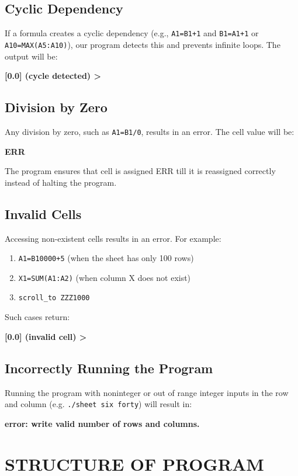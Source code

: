 \documentclass[a4paper]{article}
\begin{document}
\subsection{Cyclic Dependency}
If a formula creates a cyclic dependency (e.g., \texttt{A1=B1+1} and \texttt{B1=A1+1} or \texttt{A10=MAX(A5:A10)}), our program detects this and prevents infinite loops. The output will be:
\begin{center}
    \textbf{[0.0] (cycle detected) >}
\end{center}

\subsection{Division by Zero}
Any division by zero, such as \texttt{A1=B1/0}, results in an error. The cell value will be:
\begin{center}
    \textbf{ERR}
\end{center}
The program ensures that cell is assigned ERR till it is reassigned correctly instead of halting the program.

\subsection{Invalid Cells}
Accessing non-existent cells results in an error. For example:
\begin{enumerate}
    \item \texttt{A1=B10000+5} (when the sheet has only 100 rows)
    \item \texttt{X1=SUM(A1:A2)} (when column X does not exist)
    \item \texttt{scroll\_to ZZZ1000} 
\end{enumerate}
Such cases return:
\begin{center}
    \textbf{[0.0] (invalid cell) >}
\end{center}

\subsection{Incorrectly Running the Program}
Running the program with noninteger or out of range integer inputs in the row and column  (e.g. \texttt{./sheet six forty}) will result in:
\begin{center}
    \textbf{error: write valid number of rows and columns.}
\end{center}



\section{STRUCTURE OF PROGRAM}
\end{document}
